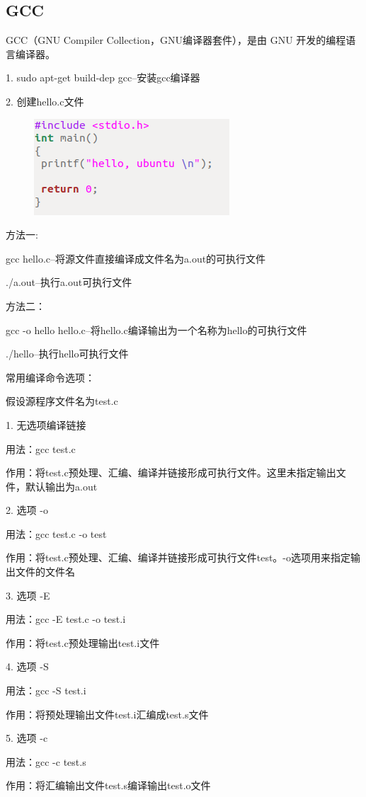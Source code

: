 \documentclass[12pt,a4paper]{article}
\begin{document}
\subsection{ GCC }
GCC（GNU Compiler Collection，GNU编译器套件），是由 GNU 开发的编程语言编译器。

1. sudo apt-get build-dep gcc--安装gcc编译器

2. 创建hello.c文件
\begin{figure}[H]
\centering
\includegraphics[scale=0.5]{./figures/11.png}
\caption{}
\end{figure}

方法一:

 gcc hello.c--将源文件直接编译成文件名为a.out的可执行文件

 ./a.out--执行a.out可执行文件

方法二：

gcc -o hello hello.c--将hello.c编译输出为一个名称为hello的可执行文件

./hello--执行hello可执行文件

常用编译命令选项：

假设源程序文件名为test.c

1. 无选项编译链接

用法：gcc test.c

作用：将test.c预处理、汇编、编译并链接形成可执行文件。这里未指定输出文件，默认输出为a.out

2. 选项 -o

用法：gcc test.c -o test

作用：将test.c预处理、汇编、编译并链接形成可执行文件test。-o选项用来指定输出文件的文件名

3. 选项 -E

用法：gcc -E test.c -o test.i

作用：将test.c预处理输出test.i文件

4. 选项 -S

用法：gcc -S test.i 

作用：将预处理输出文件test.i汇编成test.s文件

5. 选项 -c

用法：gcc -c test.s

作用：将汇编输出文件test.s编译输出test.o文件
\end{document}

